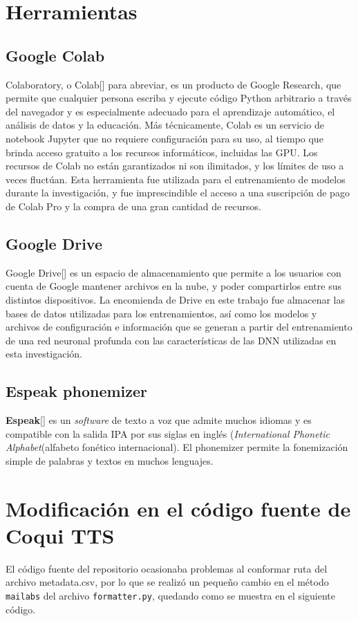 \section{Herramientas}
\subsection{Google Colab}
Colaboratory, o Colab[\cite{colab}] para abreviar, es un producto de Google Research, que permite que cualquier persona escriba y ejecute código Python arbitrario a través del navegador y es especialmente adecuado para el aprendizaje automático, el análisis de datos y la educación. Más técnicamente, Colab es un servicio de notebook Jupyter que no requiere configuración para su uso, al tiempo que brinda acceso gratuito a los recursos informáticos, incluidas las GPU. Los recursos de Colab no están garantizados ni son ilimitados, y los límites de uso a veces fluctúan. Esta herramienta fue utilizada para el entrenamiento de modelos durante la investigación, y fue imprescindible el acceso a una suscripción de pago de Colab Pro y la compra de una gran cantidad de recursos. 

\subsection{Google Drive}
Google Drive[\cite{drive}] es un espacio de almacenamiento que permite a los usuarios con cuenta de Google mantener archivos en la nube, y poder compartirlos entre sus distintos dispositivos. La encomienda de Drive en este trabajo fue almacenar las bases de datos utilizadas para los entrenamientos, así como los modelos y archivos de configuración e información que se generan a partir del entrenamiento de una red neuronal profunda con las características de las DNN utilizadas en esta investigación.

\subsection{Espeak phonemizer}
\textbf{Espeak}[\cite{espeak}] es un \textit{software} de texto a voz que admite muchos idiomas y  es compatible con la salida IPA por sus siglas en inglés (\textit{International Phonetic Alphabet}(alfabeto fonético internacional).
El phonemizer permite la fonemización simple de palabras y textos en muchos lenguajes.

\section{Modificación en el código fuente de Coqui TTS}
El código fuente del repositorio ocasionaba problemas al conformar ruta del archivo metadata.csv, por lo que se realizó un pequeño cambio en el método \texttt{mailabs} del archivo \texttt{formatter.py}, quedando como se muestra en el siguiente código.


